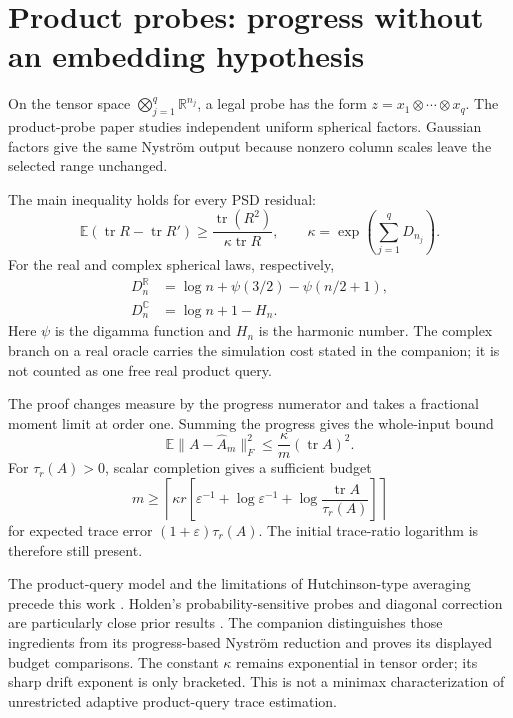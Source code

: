 \documentclass[11pt,a4paper]{article}
\newcommand{\E}{\mathbb E}
\newcommand{\tr}{\operatorname{tr}}
\newcommand{\eps}{\varepsilon}
\newcommand{\norm}[1]{\lVert#1\rVert}
\begin{document}
\section{Product probes: progress without an embedding hypothesis}
On the tensor space $\bigotimes_{j=1}^q\mathbb R^{n_j}$, a legal probe has
the form $z=x_1\otimes\cdots\otimes x_q$. The product-probe paper
\cite{Drift} studies independent uniform spherical factors. Gaussian
factors give the same Nystr\"om output because nonzero column scales leave
the selected range unchanged.

The main inequality holds for every PSD residual:
\begin{equation}\label{eq:prod}
 \E(\tr R-\tr R')\ge\frac{\tr(R^2)}{\kappa\tr R},
 \qquad \kappa=\exp\left(\sum_{j=1}^qD_{n_j}\right).
\end{equation}
For the real and complex spherical laws, respectively,
\begin{align*}
 D_n^{\mathbb R}&=\log n+\psi(3/2)-\psi(n/2+1),\\
 D_n^{\mathbb C}&=\log n+1-H_n.
\end{align*}
Here $\psi$ is the digamma function and $H_n$ is the harmonic number.
The complex branch on a real oracle carries the simulation cost stated in
the companion; it is not counted as one free real product query.

The proof changes measure by the progress numerator and takes a fractional
moment limit at order one. Summing the progress gives the whole-input bound
\begin{equation}\label{eq:energy}
 \E\norm{A-\widehat A_m}_F^2\le\frac{\kappa}{m}(\tr A)^2.
\end{equation}
For $\tau_r(A)>0$, scalar completion gives a sufficient budget
\[
 m\ge\left\lceil\kappa r\left[
 \eps^{-1}+\log\eps^{-1}+\log\frac{\tr A}{\tau_r(A)}
 \right]\right\rceil
\]
for expected trace error $(1+\eps)\tau_r(A)$. The initial trace-ratio
logarithm is therefore still present.

The product-query model and the limitations of Hutchinson-type averaging
precede this work \cite{MSW,MA}. Holden's probability-sensitive probes and
diagonal correction are particularly close prior results \cite{Holden}.
The companion distinguishes those ingredients from its progress-based
Nystr\"om reduction and proves its displayed budget comparisons.
The constant $\kappa$ remains exponential in tensor order; its sharp drift
exponent is only bracketed. This is not a minimax characterization of
unrestricted adaptive product-query trace estimation.
\end{document}
